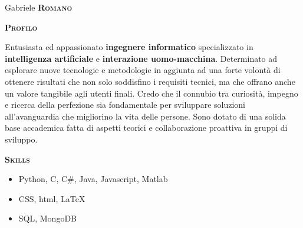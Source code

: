 \documentclass[11pt, a4paper]{article}
\newcommand{\headleft}[1]{\vspace*{2.7ex}\textsc{\textbf{#1}}\par%
    \vspace*{-1.5ex}\hrulefill\par\vspace*{0.7ex}}
\begin{document}
\setlength{\topskip}{0.1pt}
\setlength{\parindent}{0pt}
\setlength{\parskip}{0pt}
\setlength{\fboxsep}{0pt}
\pagestyle{empty}
\raggedbottom

\begin{minipage}[t]{0.34\textwidth} %
\colorbox{cvblue}{\begin{minipage}[t][5mm][t]{\textwidth}\null\hfill\null\end{minipage}}

\vspace{-.2ex} %
\colorbox{cvblue!90}{\color{white}  %
\textwidth\relax%
\begin{minipage}[t][293mm][t]{0.82\textwidth}
\raggedright
\vspace*{2ex}

\centering \Large Gabriele \textbf{\textsc{Romano}} \normalsize 

\vspace*{2ex}

\headleft{Profilo}
Entusiasta ed appassionato \textbf{ingegnere informatico} specializzato in \textbf{intelligenza artificiale} e \textbf{interazione uomo-macchina}. %
Determinato ad esplorare nuove tecnologie e metodologie in aggiunta ad una forte volontà di ottenere risultati che non solo soddisfino i requisiti tecnici, ma che offrano anche un valore tangibile agli utenti finali. %
Credo che il connubio tra curiosità, impegno e ricerca della perfezione sia fondamentale per sviluppare soluzioni all'avanguardia che migliorino la vita delle persone. %
Sono dotato di una solida base accademica fatta di aspetti teorici e collaborazione proattiva in gruppi di sviluppo. %

\headleft{Skills}
\begin{itemize}
    \item Python, C, C\#, Java, Javascript, Matlab
    \item CSS, html, \LaTeX
    \item SQL, MongoDB
\end{itemize} 


\end{minipage}}
\end{minipage}
\end{document}
